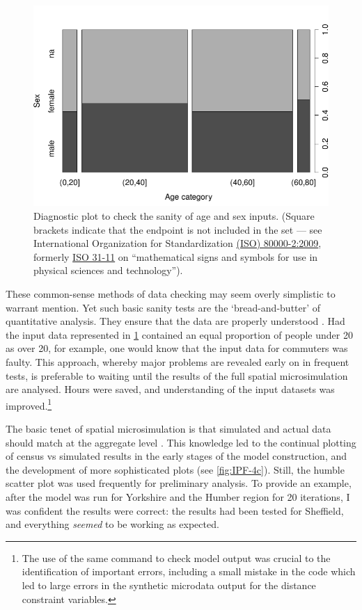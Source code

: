 \documentclass[a4paper, 11pt, twoside]{article}
\begin{document}
\begin{figure}[h]
 \begin{center}
   \includegraphics[width = 12cm]{age-sex-plot}
 \end{center}
\caption[Diagnostic plot to check the sanity of age and sex inputs.]{Diagnostic
plot to check the sanity of age and sex inputs. (Square brackets
indicate that the endpoint is not included in the set --- see
International Organization for Standardization
\href{http://www.iso.org/iso/catalogue_detail?csnumber=31887}{(ISO) 80000-2:2009},
formerly \href{http://en.wikipedia.org/wiki/Interval_(mathematics)}{ISO 31-11}
on ``mathematical signs and symbols for use in physical sciences and technology'').}
 \label{fasp}
\end{figure}
These common-sense methods of data checking may seem overly simplistic to warrant
mention. Yet such basic sanity tests are the `bread-and-butter' of
quantitative analysis. They ensure that the data are properly
understood \citep{Wickham2008}. Had the input data represented in \cref{fasp}
contained an equal proportion of people under 20 as over 20, for example,
one would know that the input data for commuters was faulty.
This approach, whereby major
problems are revealed early on in frequent tests, is preferable to waiting
until the results of the full spatial microsimulation are analysed. Hours were
saved, and understanding of the input datasets was improved.\footnote{The
use of the
same command to check model output was crucial to the identification of
important errors, including a small mistake in the code which led to large
errors in the synthetic microdata output for the distance constraint variables.}

The basic tenet of spatial microsimulation is that simulated and actual data
should match at the aggregate level \citep{Ballas2007simb}.
This knowledge led to the
continual plotting of census vs simulated results in the early stages of the
model construction, and the development of more
sophisticated plots (see \cref{fig:IPF-4c}).
Still, the humble scatter plot was used frequently for
preliminary analysis. To provide an example, after the model was run for
Yorkshire
and the Humber region for 20 iterations, I was confident the results were
correct: the results had been tested for Sheffield, and everything
\emph{seemed} to be working as expected.
\end{document}
